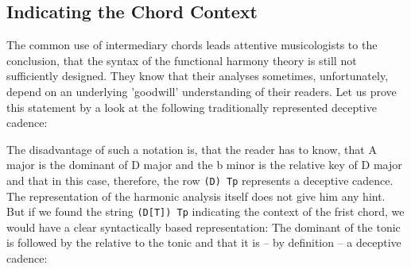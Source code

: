 \documentclass[
  DIV=calc,
  BCOR=5mm,
  12pt,
  headings=small,
  oneside,
  abstract=true,
  toc=bib,
  xcolor=dvipsnames,
  openany,
  ngerman,english]{scrartcl}
\begin{document}
\subsection{Indicating the Chord Context}

The common use of intermediary chords leads attentive musicologists to the
conclusion, that the syntax of the functional harmony theory is still not
sufficiently designed. They know that their analyses sometimes, unfortunately,
depend on an underlying 'goodwill' understanding of their readers. Let us prove
this statement by a look at the following traditionally represented deceptive
cadence:

\begin{center}
\end{center}

The disadvantage of such a notation is, that the reader has to know, that A
major is the dominant of D major and the b minor is the relative key of D major
and that in this case, therefore, the row \texttt{(D) Tp} represents a deceptive
cadence. The representation of the harmonic analysis itself does not give him
any hint. But if we found the string \texttt{(D[T]) Tp} indicating the context
of the frist chord, we would have a clear syntactically based representation:
The dominant of the tonic is followed by the relative to the tonic and that it
is -- by definition -- a deceptive cadence:

\begin{center}
\end{center}
\end{document}
